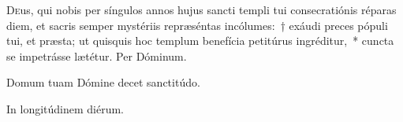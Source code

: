 \documentclass[vesperale_romanum.tex]{subfiles}
\begin{document}

\lettrine{D}{e}us, qui nobis per síngulos annos hujus sancti templi tui consecratiónis réparas diem, et sacris semper mystériis repræséntas incólumes:~† exáudi preces pópuli tui, et præsta; ut quisquis hoc templum benefícia petitúrus ingréditur,~* cuncta se impetrásse lætétur. Per Dóminum.


\omniapraeter

\vv Domum tuam Dómine decet sanctitúdo.
 
\rr In longitúdinem diérum.


\end{document}

